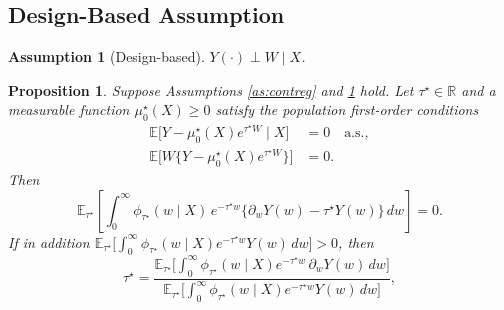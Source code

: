 \documentclass[11pt]{article}
\newtheorem{proposition}[theorem]{Proposition}
\newtheorem{assumption}{Assumption}
\theoremstyle{definition}
\theoremstyle{plain}
\newcommand{\E}{\mathbb{E}}
\newcommand{\1}{\mathbf{1}}
\newcommand{\R}{\mathbb{R}}
\begin{document}
\subsection{Design-Based Assumption}

\begin{assumption}[Design-based]
\label{as:contdesign}
$Y(\cdot)\perp W\mid X$.
\end{assumption}

\begin{proposition}
\label{prop:continuous}
Suppose Assumptions \ref{as:contreg} and \ref{as:contdesign} hold.  Let $\tau^\star\in\R$ and a measurable function $\mu_0^\star(X)\ge 0$ satisfy the population first-order conditions
\begin{align}
\E\big[Y-\mu_0^\star(X)e^{\tau^\star W}\mid X\big] &= 0 \quad \text{a.s.},
\label{eq:contcondFOC}
\\
\E\big[W\{Y-\mu_0^\star(X)e^{\tau^\star W}\}\big] &= 0.
\label{eq:conttreatFOC}
\end{align}
Then
\begin{equation}
\E_{\tau^\star}\left[\int_0^\infty \phi_{\tau^\star}(w\mid X)\,e^{-\tau^\star w}\bigl\{\partial_wY(w)-\tau^\star Y(w)\bigr\}\,dw\right]=0 .
\label{eq:contpseudotrue}
\end{equation}
If in addition $\E_{\tau^\star}\bigl[\int_0^\infty\phi_{\tau^\star}(w\mid X)e^{-\tau^\star w}Y(w)\,dw\bigr]>0$, then
\begin{equation}
\tau^\star
=
\frac{\E_{\tau^\star}\bigl[\int_0^\infty\phi_{\tau^\star}(w\mid X)e^{-\tau^\star w}\,\partial_wY(w)\,dw\bigr]}
     {\E_{\tau^\star}\bigl[\int_0^\infty\phi_{\tau^\star}(w\mid X)e^{-\tau^\star w}Y(w)\,dw\bigr]} ,
\label{eq:contratio}
\end{equation}
\end{proposition}
\end{document}
